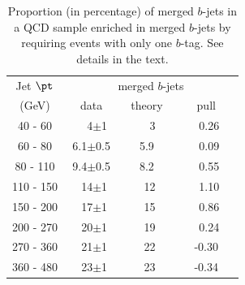 \begin{table}[!hbt] %
\renewcommand{\arraystretch}{1.2}
\centering
\begin{tabular}{ | c || c | c | c ||}
  \hline
  Jet $\pt$ & \multicolumn{3}{c||}{merged $b$-jets}\\ \cline{2-4}
    (GeV) & ~~data~~ & ~theory~ & ~~~pull~~~\\ \hline
   40 - 60 &  ~~4$\pm$1  &    ~~3  &  ~0.26  \\  
   60 - 80 &  6.1$\pm$0.5  &  5.9  &  ~0.09  \\ 
   80 - 110&  9.4$\pm$0.5  &  8.2  &  ~0.55  \\ 
  110 - 150&  ~14$\pm$1    &  ~12  &  ~1.10  \\ 
  150 - 200&  ~17$\pm$1    &  ~15  &  ~0.86  \\ 
  200 - 270&  ~20$\pm$1    &  ~19  &  ~0.24  \\ 
  270 - 360&  ~21$\pm$1    &  ~22  &  -0.30  \\ 
  360 - 480&  ~23$\pm$1    &  ~23  &  -0.34  \\ \hline
\end{tabular}
\caption{Proportion (in percentage) of merged $b$-jets in a QCD sample enriched in merged $b$-jets by requiring events with only one $b$-tag. See details in the text.}
\label{tb:fitfractions2btagM}
\end{table}


